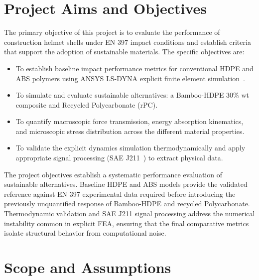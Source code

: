 \section{Project Aims and Objectives}
The primary objective of this project is to evaluate the performance of 
construction helmet shells under EN 397 impact conditions and establish 
criteria that support the adoption of sustainable materials. The specific 
objectives are:
\begin{itemize}
    \item To establish baseline impact performance metrics for conventional 
    HDPE and ABS polymers using ANSYS LS-DYNA explicit finite element 
    simulation~\cite{lsdyna2021}.
    \item To simulate and evaluate sustainable alternatives: a Bamboo-HDPE 
    30\% wt composite and Recycled Polycarbonate (rPC).
    \item To quantify macroscopic force transmission, energy absorption 
    kinematics, and microscopic stress distribution across the different 
    material properties.
    \item To validate the explicit dynamics simulation thermodynamically and 
    apply appropriate signal processing (SAE J211~\cite{sae1995}) to extract physical data.
\end{itemize}

The project objectives establish a systematic performance evaluation of sustainable alternatives. Baseline HDPE and ABS models provide the validated reference against EN 397 experimental data required before introducing the previously unquantified response of Bamboo-HDPE and recycled Polycarbonate. Thermodynamic validation and SAE J211 signal processing address the numerical instability common in explicit FEA, ensuring that the final comparative metrics isolate structural behavior from computational noise.


\section{Scope and Assumptions}

